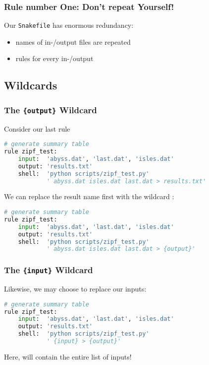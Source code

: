 \begin{frame}
  \frametitle{Rule number One: Don't repeat Yourself!}

Our \texttt{Snakefile} has enormous redundancy: 
\begin{itemize}
 \item names of in-/output files are repeated
 \item rules for every in-/output
\end{itemize}
\end{frame}

\subsection{Wildcards}

\begin{frame}[fragile]
  \frametitle{The \texttt{\{output\}} Wildcard}
  Consider our last rule
  \begin{lstlisting}[language=Python,style=Python]
# generate summary table
rule zipf_test:
    input:  'abyss.dat', 'last.dat', 'isles.dat'
    output: 'results.txt'
    shell:  'python scripts/zipf_test.py' 
            ' abyss.dat isles.dat last.dat > results.txt'
  \end{lstlisting}
  We can replace the result name first with the wildcard :
  \begin{lstlisting}[language=Python,style=Python]
# generate summary table
rule zipf_test:
    input:  'abyss.dat', 'last.dat', 'isles.dat'
    output: 'results.txt'
    shell:  'python scripts/zipf_test.py' 
            ' abyss.dat isles.dat last.dat > {output}'
  \end{lstlisting}
\end{frame}

\begin{frame}[fragile]
  \frametitle{The \texttt{\{input\}} Wildcard}
  Likewise, we may choose to replace our inputs:
  \begin{lstlisting}[language=Python,style=Python]
# generate summary table
rule zipf_test:
    input:  'abyss.dat', 'last.dat', 'isles.dat'
    output: 'results.txt'
    shell:  'python scripts/zipf_test.py' 
            ' {input} > {output}'
  \end{lstlisting}
  Here,  will contain the entire list of inputs!
\end{frame}

